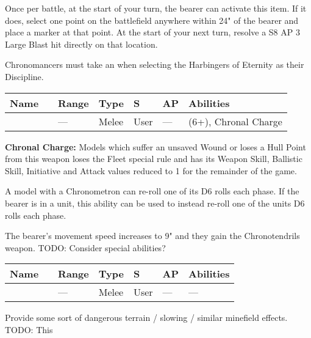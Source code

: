 
Once per battle, at the start of your turn, the bearer can activate this item. If it does, select one point on the battlefield anywhere within 24" of the bearer and place a marker at that point. At the start of your next turn, resolve a S8 AP 3 Large Blast hit directly on that location.




Chronomancers must take an  when selecting the Harbingers of Eternity as their Discipline.

\label{Aeonstave}
\noindent
\begin{tabular}{||m{130pt} m{10pt} m{31pt} m{55pt} m{12pt} m{12pt} m{210pt}||}
	\hline
	Name & & Range & Type & S & AP & Abilities \\
	\hline
	\quickref{Aeonstave} & & — & Melee & User & — & \quickref{Entropic Strike} (6+), Chronal Charge \\
	\hline
\end{tabular}
\textbf{Chronal Charge:} Models which suffer an unsaved Wound or loses a Hull Point from this weapon loses the Fleet special rule and has its Weapon Skill, Ballistic Skill, Initiative and Attack values reduced to 1 for the remainder of the game.


A model with a Chronometron can re-roll one of its D6 rolls each phase. If the bearer is in a unit, this ability can be used to instead re-roll one of the units D6 rolls each phase.


The bearer's movement speed increases to 9" and they gain the Chronotendrils weapon. TODO: Consider special abilities?

\label{Chronotendrils}
\noindent
\begin{tabular}{||m{130pt} m{10pt} m{31pt} m{55pt} m{12pt} m{12pt} m{210pt}||}
	\hline
	Name & & Range & Type & S & AP & Abilities \\
	\hline
	\quickref{Chronotendrils} & & — & Melee & User & — & — \\
	\hline
\end{tabular}


Provide some sort of dangerous terrain / slowing / similar minefield effects. TODO: This

